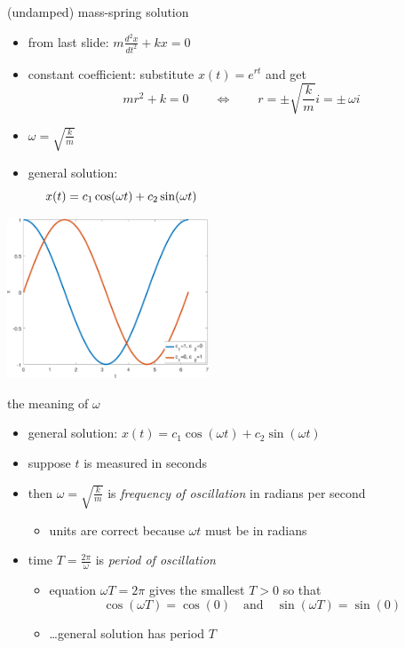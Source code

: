 \documentclass[urlcolor=blue,dvipsnames]{beamer}
\begin{document}
\begin{frame}{(undamped) mass-spring solution}

\begin{itemize}
\item from last slide: $m \frac{d^2x}{dt^2} + k x = 0$
\item constant coefficient: substitute $x(t)=e^{rt}$ and get
    $$m r^2 + k = 0 \qquad \iff \qquad r = \pm \sqrt{\frac{k}{m}} i = \pm\, \omega i$$
\item \alert{$\omega = \sqrt{\frac{k}{m}}$}
\item general solution:
    $$x(t) = c_1 \cos(\omega t) + c_2 \sin(\omega t) \hspace{70mm}$$
\end{itemize}

\vspace{-20mm}
\hfill \includegraphics[width=0.45\textwidth]{figs/cossin}
\end{frame}


\begin{frame}{the meaning of $\omega$}

\begin{itemize}
\item general solution: $x(t) = c_1 \cos(\omega t) + c_2 \sin(\omega t)$
\item suppose $t$ is measured in seconds
\item then $\omega = \sqrt{\frac{k}{m}}$ is \alert{\emph{frequency of oscillation}} in radians per second
    \begin{itemize}
    \item units are correct because $\omega t$ must be in radians
    \end{itemize}
\item time \alert{$T = \frac{2\pi}{\omega}$} is \emph{period of oscillation}
    \begin{itemize}
    \item equation $\omega T=2\pi$ gives the smallest $T>0$ so that
        $$\cos(\omega T) = \cos(0) \quad \text{and} \quad \sin(\omega T) = \sin(0)$$
    \item \dots general solution has period $T$
    \end{itemize}
\end{itemize}
\end{frame}
\end{document}
